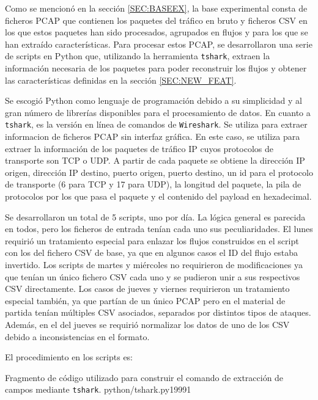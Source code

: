 Como se mencionó en la sección \ref{SEC:BASEEX}, la base experimental consta de ficheros PCAP que contienen los paquetes del tráfico en bruto y ficheros CSV en los que estos paquetes han sido procesados, agrupados en flujos y para los que se han extraído características. Para procesar estos PCAP, se desarrollaron una serie de scripts en Python que, utilizando la herramienta \texttt{tshark}, extraen la información necesaria de los paquetes para poder reconstruir los flujos y obtener las características definidas en la sección \ref{SEC:NEW_FEAT}.

Se escogió Python como lenguaje de programación debido a su simplicidad y al gran número de librerías disponibles para el procesamiento de datos. En cuanto a \texttt{tshark}, es la versión en línea de comandos de \texttt{Wireshark}. Se utiliza para extraer informacion de ficheros PCAP sin interfaz gráfica. En este caso, se utiliza para extraer la información de los paquetes de tráfico IP cuyos protocolos de transporte son TCP o UDP. A partir de cada paquete se obtiene la dirección IP origen, dirección IP destino, puerto origen, puerto destino, un id para el protocolo de transporte (6 para TCP y 17 para UDP), la longitud del paquete, la pila de protocolos por los que pasa el paquete y el contenido del payload en hexadecimal. 

Se desarrollaron un total de 5 scripts, uno por día. La lógica general es parecida en todos, pero los ficheros de entrada tenían cada uno sus peculiaridades. El lunes requirió un tratamiento especial para enlazar los flujos construidos en el script con los del fichero CSV de base, ya que en algunos casos el ID del flujo estaba invertido. Los scripts de martes y miércoles no requirieron de modificaciones ya que tenían un único fichero CSV cada uno y se pudieron unir a sus respectivos CSV directamente. Los casos de jueves y viernes requirieron un tratamiento especial también, ya que partían de un único PCAP pero en el material de partida tenían múltiples CSV asociados, separados por distintos tipos de ataques. Además, en el del jueves se requirió normalizar los datos de uno de los CSV debido a inconsistencias en el formato.

El procedimiento en los scripts es:

{Fragmento de código utilizado para construir el comando de extracción de campos mediante \texttt{tshark}.}
{python/tshark.py}{1}{999}{1}